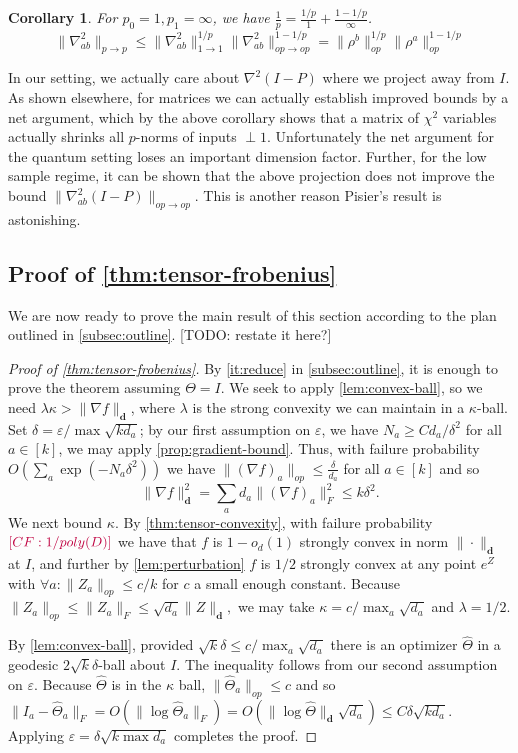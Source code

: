 \documentclass{article}
\newtheorem{corollary}[theorem]{Corollary}
\renewcommand{\vec}{\bm}
\newcommand\eps{\varepsilon}
\newcommand{\CF}[1]{{\color{purple}[CF: #1]}}
\newcommand{\TODO}[1]{{\color{blue}[TODO: #1]}}
\begin{document}
\begin{corollary}
For $p_{0} = 1, p_{1} = \infty$, we have $\frac{1}{p} = \frac{1/p}{1} + \frac{1-1/p}{\infty}$. 
\[ \|\nabla_{ab}^{2}\|_{p \to p} \leq \|\nabla_{ab}^{2}\|_{1 \to 1}^{1/p} \|\nabla_{ab}^{2}\|_{op \to op}^{1-1/p} = \|\rho^{b}\|_{op}^{1/p} \|\rho^{a}\|_{op}^{1-1/p}  \]
\end{corollary}

In our setting, we actually care about $\nabla^{2} (I-P)$ where we project away from $I$. As shown elsewhere, for matrices we can actually establish improved bounds by a net argument, which by the above corollary shows that a matrix of $\chi^{2}$ variables actually shrinks all $p$-norms of inputs $\perp 1$. Unfortunately the net argument for the quantum setting loses an important dimension factor. Further, for the low sample regime, it can be shown that the above projection does not improve the bound $\|\nabla_{ab}^{2} (I-P)\|_{op \to op}$. This is another reason Pisier's result is astonishing. 


\subsection{Proof of \cref{thm:tensor-frobenius}}
We are now ready to prove the main result of this section according to the plan outlined in \cref{subsec:outline}.
\TODO{restate it here?}
\begin{proof}[Proof of \cref{thm:tensor-frobenius}]By \cref{it:reduce} in \cref{subsec:outline}, it is enough to prove the theorem assuming $\Theta = I$.
We seek to apply \cref{lem:convex-ball}, so we need $\lambda \kappa > \|\nabla f\|_{\vec d}$, where $\lambda$ is the strong convexity we can maintain in a $\kappa$-ball. Set $\delta = \eps/\max \sqrt{k d_a}$; by our first assumption on $\eps$, we have $N_a \geq C d_a/\delta^2$ for all $a \in [k]$, we may apply \cref{prop:gradient-bound}. Thus, with failure probability $O\left( \sum_a \exp ( - N_a \delta^2)\right)$ we have $\|(\nabla f)_{a}\|_{op} \leq \frac{\delta}{d_{a}}$ for all $a \in [k]$ and so
\[  \|\nabla f\|_{\vec d}^{2} = \sum_{a} d_{a} \|(\nabla f)_{a}\|_{F}^{2} \leq  k \delta^{2}.  \]
We next bound $\kappa$. By \cref{thm:tensor-convexity}, with failure probability $\CF{1/poly(D)}$ we have that $f$ is $1-o_{d}(1)$ strongly convex in norm $\|\cdot\|_{\vec d}$ at $I$, and further by \cref{lem:perturbation} $f$ is $1/2$ strongly convex at any point $e^{Z}$ with $\forall a: \|Z_{a}\|_{op} \leq  c/k$ for $c$ a small enough constant. Because $\|Z_a\|_{op} \leq \|Z_a\|_F \leq \sqrt{d_a} \|Z\|_{\vec d},$ we may take $\kappa = c/\max_a \sqrt{d_a}$ and $\lambda = 1/2$.

By \cref{lem:convex-ball}, provided $\sqrt{k} \delta \leq c/\max_a \sqrt{d_a} $ there is an optimizer $\widehat{\Theta}$ in a geodesic $2 \sqrt{k} \delta$-ball about $I$. The inequality follows from our second assumption on $\eps$. Because $\widehat{\Theta}$ is in the $\kappa$ ball, $\|\widehat{\Theta}_a\|_{op} \leq c$ and so $\|I_a - \widehat{\Theta}_a\|_F = O( \| \log \widehat{\Theta}_a\|_F) = O( \|\log \widehat{\Theta}\|_{\vec d} \sqrt{d_a})  \leq C \delta \sqrt{k d_a}.$ Applying $\eps = \delta \sqrt{k \max d_a}$ completes the proof.
\end{proof}
\end{document}
